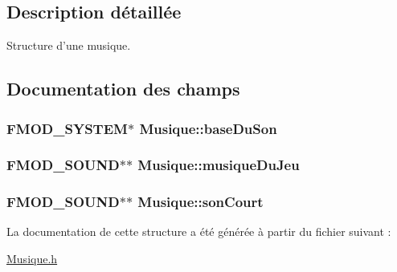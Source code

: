 \subsection{Description détaillée}
Structure d'une musique. 

\subsection{Documentation des champs}
\hypertarget{structMusique_a5ac7591cc431a2ef548d48e9cf858d94}{
\subsubsection[{base\-Du\-Son}]{\setlength{\rightskip}{0pt plus 5cm}F\-M\-O\-D\-\_\-\-S\-Y\-S\-T\-E\-M$\ast$ Musique\-::base\-Du\-Son}}\label{structMusique_a5ac7591cc431a2ef548d48e9cf858d94}
\hypertarget{structMusique_a442e0e2e689699e3bb72eb8c8e4e14c2}{
\subsubsection[{musique\-Du\-Jeu}]{\setlength{\rightskip}{0pt plus 5cm}F\-M\-O\-D\-\_\-\-S\-O\-U\-N\-D$\ast$$\ast$ Musique\-::musique\-Du\-Jeu}}\label{structMusique_a442e0e2e689699e3bb72eb8c8e4e14c2}
\hypertarget{structMusique_ae957f32de4befa0f625f4b7229e3d660}{
\subsubsection[{son\-Court}]{\setlength{\rightskip}{0pt plus 5cm}F\-M\-O\-D\-\_\-\-S\-O\-U\-N\-D$\ast$$\ast$ Musique\-::son\-Court}}\label{structMusique_ae957f32de4befa0f625f4b7229e3d660}


La documentation de cette structure a été générée à partir du fichier suivant \-:\begin{DoxyCompactItemize}
\item 
\hyperlink{Musique_8h}{Musique.\-h}\end{DoxyCompactItemize}
